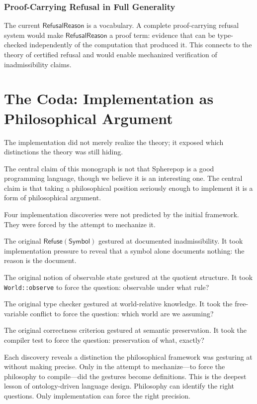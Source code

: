 \documentclass[12pt, a4paper, openany]{book}
\theoremstyle{plain}
\theoremstyle{definition}
\theoremstyle{remark}
\newcommand{\Refuse}{\mathsf{Refuse}}
\begin{document}
\subsection{Proof-Carrying Refusal in Full Generality}

The current $\mathsf{RefusalReason}$ is a vocabulary. A complete proof-carrying
refusal system would make $\mathsf{RefusalReason}$ a proof term: evidence that
can be type-checked independently of the computation that produced it. This
connects to the theory of certified refusal and would enable mechanized
verification of inadmissibility claims.

\chapter{The Coda: Implementation as Philosophical Argument}

The implementation did not merely realize the theory; it exposed which distinctions
the theory was still hiding.

The central claim of this monograph is not that Spherepop is a good programming
language, though we believe it is an interesting one. The central claim is that
taking a philosophical position seriously enough to implement it is a form of
philosophical argument.

Four implementation discoveries were not predicted by the initial framework. They
were forced by the attempt to mechanize it.

The original $\Refuse(\mathsf{Symbol})$ gestured at documented inadmissibility.
It took implementation pressure to reveal that a symbol alone documents nothing:
the reason is the document.

The original notion of observable state gestured at the quotient structure. It
took \texttt{World::observe} to force the question: observable under what rule?

The original type checker gestured at world-relative knowledge. It took the
free-variable conflict to force the question: which world are we assuming?

The original correctness criterion gestured at semantic preservation. It took the
compiler test to force the question: preservation of what, exactly?

Each discovery reveals a distinction the philosophical framework was gesturing at
without making precise. Only in the attempt to mechanize---to force the philosophy
to compile---did the gestures become definitions. This is the deepest lesson of
ontology-driven language design. Philosophy can identify the right questions. Only
implementation can force the right precision.
\end{document}
